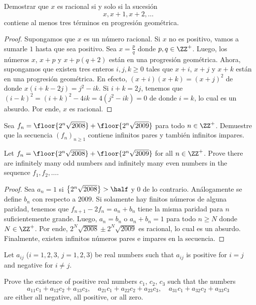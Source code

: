 
\begin{probEG}
	Demostrar que $x$ es racional si y solo si la sucesión
	\[x,x+1,x+2,\dots\]
	contiene al menos tres términos en progresión geométrica.
\end{probEG}

\begin{proof}
	Supongamos que $x$ es un número racional. Si $x$ no es positivo, vamos a sumarle $1$ hasta que sea positivo. Sea $x=\frac pq$ donde $p,q\in\ZZ^+$. Luego, los números $x$, $x+p$ y $x+p(q+2)$ están en una progresión geométrica. Ahora, supongamos que existen tres enteros $i,j,k\ge 0$ tales que $x+i$, $x+j$ y $x+k$ están en una progresión geométrica. En efecto, $(x+i)(x+k)=(x+j)^2$ de donde $x(i+k-2j)=j^2-ik$. Si $i+k=2j$, tenemos que $(i-k)^2=(i+k)^2-4ik=4(j^2-ik)=0$ de donde $i=k$, lo cual es un absurdo. Por ende, $x$ es racional.
\end{proof}

\begin{probEG}[CGMO 2008/8]
	Sea $f_n=\floor{2^n\sqrt{2008}}+\floor{2^n\sqrt{2009}}$ para todo $n\in\ZZ^+$. Demuestre que la secuencia $(f_n)_{n\ge 1}$ contiene infinitos pares y también infinitos impares.
	\begin{hint}
		Let $f_n=\floor{2^n\sqrt{2008}}+\floor{2^n\sqrt{2009}}$ for all $n\in\ZZ^+$. Prove there are infinitely many odd numbers and infinitely many even numbers in the sequence $f_1,f_2,\dots$.
	\end{hint}
\end{probEG}

\begin{proof}
	Sea $a_n=1$ si $\left\{2^n\sqrt{2008}\right\}>\half$ y $0$ de lo contrario. Análogamente se define $b_n$ con respecto a $2009$. Si solamente hay finitos números de alguna paridad, tenemos que $f_{n+1}-2f_n=a_n+b_n$ tiene la misma paridad para $n$ suficientemente grande. Luego, $a_n=b_n$ o $a_n+b_n=1$ para todo $n\ge N$ donde $N\in\ZZ^+$. Por ende, $2^N\sqrt{2008}\pm2^N\sqrt{2009}$ es racional, lo cual es un absurdo. Finalmente, existen infinitos números pares e impares en la secuencia.
\end{proof}


\begin{probEB}[ISL 2003/A1]
	Let $a_{ij}$ ($i=1,2,3$, $j=1,2,3$) be real numbers such that $a_{ij}$ is positive for $i=j$ and negative for $i\ne j$.

	Prove the existence of positive real numbers $c_{1}$, $c_{2}$, $c_{3}$ such that the numbers
	\[a_{11}c_{1}+a_{12}c_{2}+a_{13}c_{3},\quad a_{21}c_{1}+a_{22}c_{2}+a_{23}c_{3},\quad a_{31}c_{1}+a_{32}c_{2}+a_{33}c_{3}\]
	are either all negative, all positive, or all zero.
\end{probEB}

